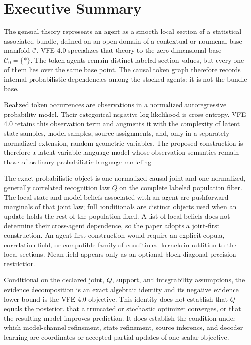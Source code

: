 \chapter*{Executive Summary}

The general theory represents an agent as a smooth local section of a statistical associated bundle, defined on an open domain of a contextual or noumenal base manifold \(\mathcal C\). VFE 4.0 specializes that theory to the zero-dimensional base \(\mathcal C_0=\{\ast\}\). The token agents remain distinct labeled section values, but every one of them lies over the same base point. The causal token graph therefore records internal probabilistic dependencies among the stacked agents; it is not the bundle base.

Realized token occurrences are observations in a normalized autoregressive probability model. Their categorical negative log likelihood is cross-entropy. VFE 4.0 retains this observation term and augments it with the complexity of latent state samples, model samples, source assignments, and, only in a separately normalized extension, random geometric variables. The proposed construction is therefore a latent-variable language model whose observation semantics remain those of ordinary probabilistic language modeling.

The exact probabilistic object is one normalized causal joint and one normalized, generally correlated recognition law \(Q\) on the complete labeled population fiber. The local state and model beliefs associated with an agent are pushforward marginals of that joint law; full conditionals are distinct objects used when an update holds the rest of the population fixed. A list of local beliefs does not determine their cross-agent dependence, so the paper adopts a joint-first construction. An agent-first construction would require an explicit copula, correlation field, or compatible family of conditional kernels in addition to the local sections. Mean-field appears only as an optional block-diagonal precision restriction.

Conditional on the declared joint, \(Q\), support, and integrability assumptions, the evidence decomposition is an exact algebraic identity and its negative evidence lower bound is the VFE 4.0 objective. This identity does not establish that \(Q\) equals the posterior, that a truncated or stochastic optimizer converges, or that the resulting model improves prediction. It does establish the condition under which model-channel refinement, state refinement, source inference, and decoder learning are coordinates or accepted partial updates of one scalar objective.

